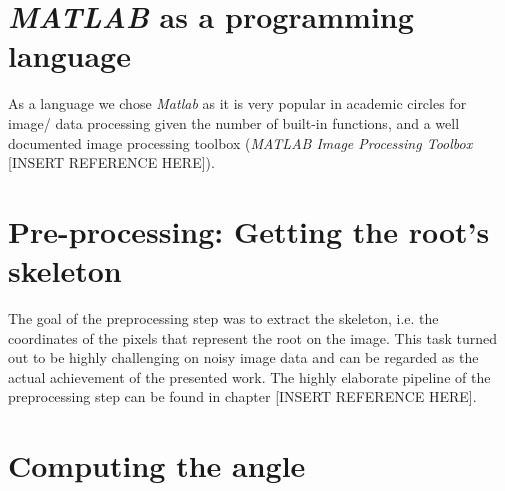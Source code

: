 \section{\textit{MATLAB} as a programming language}

As a language we chose \textit{Matlab} as it is very popular in academic circles for image/ data processing given the number of built-in functions, and a well documented image processing toolbox (\textit{MATLAB Image Processing Toolbox} [INSERT REFERENCE HERE]).


\section{Pre-processing: Getting the root's skeleton}

The goal of the preprocessing step was to extract the skeleton, i.e. the coordinates of the pixels that represent the root on the image.
This task turned out to be highly challenging on noisy image data and can be regarded as the actual achievement of the presented work. The highly elaborate pipeline of the preprocessing step can be found in chapter [INSERT REFERENCE HERE].




\section{Computing the angle}

